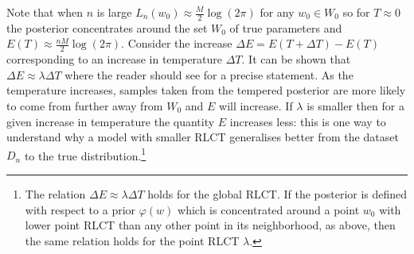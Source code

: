 \documentclass{article} %
\begin{document}
Note that when $n$ is large $L_n(w_0) \approx \frac{M}{2} \log(2\pi)$ for any $w_0 \in W_0$ so for $T \approx 0$ the posterior concentrates around the set $W_0$ of true parameters and $E(T) \approx \frac{nM}{2} \log(2\pi)$. Consider the increase $\Delta E = E(T + \Delta T) - E(T)$ corresponding to an increase in temperature $\Delta T$. It can be shown that 
$
\Delta E \approx \lambda \Delta T
$
where the reader should see \citep[Corollary 3]{watanabe_widely_2013} for a precise statement. As the temperature increases, samples taken from the tempered posterior are more likely to come from further away from $W_0$ and $E$ will increase. If $\lambda$ is smaller then for a given increase in temperature the quantity $E$ increases less: this is one way to understand why a model with smaller RLCT generalises better from the dataset $D_n$ to the true distribution.\footnote{The relation $\Delta E \approx \lambda \Delta T$ holds for the global RLCT. If the posterior is defined with respect to a prior $\varphi(w)$ which is concentrated around a point $w_0$ with lower point RLCT than any other point in its neighborhood, as above, then the same relation holds for the point RLCT $\lambda$.}




\end{document}
